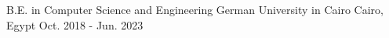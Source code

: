 

\begin{cventries}

  \cventry
    {B.E. in Computer Science and Engineering} %
    {German University in Cairo} %
    {Cairo, Egypt} %
    {Oct. 2018 - Jun. 2023} %
    {}

\end{cventries}
